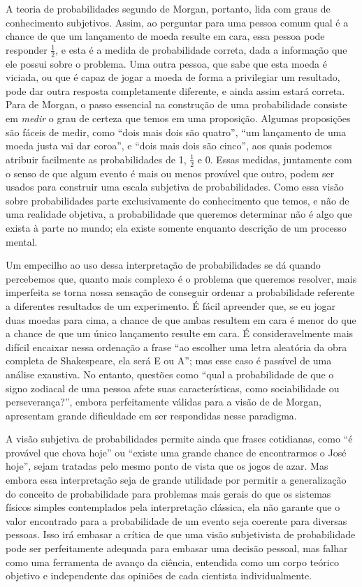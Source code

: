 A teoria de probabilidades segundo de Morgan, portanto, lida com graus de conhecimento subjetivos. Assim, ao perguntar para
uma pessoa comum qual é a chance de que um lançamento de moeda resulte em cara, essa pessoa pode responder $\frac{1}{2}$, e 
esta é a medida de probabilidade correta, dada a informação que ele possui sobre o problema. Uma outra pessoa, que sabe
que esta moeda é viciada, ou que é capaz de jogar a moeda de forma a privilegiar um resultado, pode dar outra resposta
completamente diferente, e ainda assim estará correta. Para de Morgan, o passo essencial na construção de uma probabilidade
consiste em {\em medir} o grau de certeza que temos em uma proposição. Algumas proposições são fáceis de medir, como
``dois mais dois são quatro'', ``um lançamento de uma moeda justa vai dar coroa'', e ``dois mais dois são cinco'', aos quais
podemos atribuir facilmente as probabilidades de 1, $\frac{1}{2}$ e 0. Essas medidas, juntamente com o senso de que
algum evento é mais ou menos provável que outro, podem ser usados para construir uma escala subjetiva de probabilidades.
Como essa visão sobre probabilidades parte exclusivamente do conhecimento que temos, e não de uma realidade objetiva,
a probabilidade que queremos determinar não é algo que exista à parte no mundo; ela existe somente enquanto descrição
de um processo mental.

Um empecilho ao uso dessa interpretação de probabilidades se dá quando percebemos que, quanto mais complexo é o 
problema que queremos resolver, mais imperfeita se torna nossa sensação de conseguir ordenar a probabilidade referente
a diferentes resultados de um experimento. É fácil apreender que, se eu jogar duas moedas para cima, a chance de que ambas 
resultem em cara é menor do que a chance de que um único lançamento resulte em cara. É consideravelmente mais difícil encaixar
nessa ordenação a frase ``ao escolher uma letra aleatória da obra completa de Shakespeare, ela será E ou A''; mas esse caso
é passível de uma análise exaustiva. No entanto, questões como ``qual
a probabilidade de que o signo zodiacal
de uma pessoa afete
suas características, como sociabilidade ou perseverança?'', embora perfeitamente válidas para a visão de de Morgan, apresentam
grande dificuldade em ser respondidas nesse paradigma.

A visão subjetiva de probabilidades permite ainda que frases cotidianas, como ``é provável que chova hoje'' ou ``existe uma grande
chance de encontrarmos o José hoje'', sejam tratadas pelo mesmo ponto de vista que os jogos de azar. Mas
embora essa interpretação seja de grande utilidade por permitir a generalização do conceito de probabilidade para problemas
mais gerais do que os sistemas físicos simples contemplados pela interpretação clássica, ela não garante que o valor encontrado
para a probabilidade de um evento seja coerente para diversas pessoas. Isso irá embasar a crítica de que uma visão subjetivista 
de probabilidade pode ser perfeitamente adequada para embasar uma
decisão pessoal, mas falhar como  
uma ferramenta de avanço da ciência, entendida como um corpo teórico objetivo e independente das opiniões de cada cientista individualmente.

